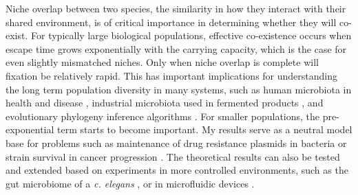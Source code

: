 Niche overlap between two species, the similarity in how they interact with their shared environment, is of critical importance in determining whether they will co-exist. 
For typically large biological populations, effective co-existence occurs when escape time grows exponentially with the carrying capacity, which is the case for even slightly mismatched niches. Only when niche overlap is complete will fixation be relatively rapid. 
This has important implications for understanding the long term population diversity in many systems, such as human microbiota in health and disease \cite{Coburn2015,Palmer2001,Kinross2011}, industrial microbiota used in fermented products \cite{Wolfe2014}, and evolutionary phylogeny inference algorithms \cite{Rice2004,Blythe2007}. 
For smaller populations, the pre-exponential term starts to become important. 
My results serve as a neutral model base for problems such as maintenance of drug resistance plasmids in bacteria \cite{Gooding-townsend2015} or strain survival in cancer progression \cite{Ashcroft2015}. The theoretical results can also be tested and extended based on experiments in more controlled environments, such as the gut microbiome of a \textit{c. elegans} \cite{Vega2017}, or in microfluidic devices \cite{Hung2005}.




